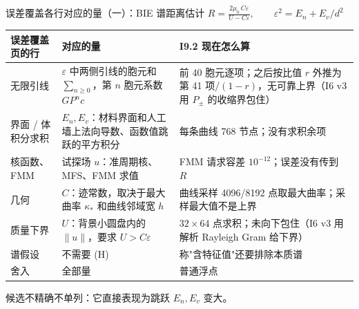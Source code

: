 \documentclass[aspectratio=169,11pt,fontset=fandol]{ctexbeamer}
\newcommand{\aside}[1]{{\footnotesize\color{muted}#1}}
\begin{document}
\begin{frame}{误差覆盖各行对应的量（一）：BIE 谱距离估计}
  \centering\small
  $\displaystyle R=\frac{2\mu_0\,C\varepsilon}{U-C\varepsilon},\qquad
    \varepsilon^2=E_n+E_v/d^2$
  \par\vspace{0.4em}\scriptsize
  \begin{tabular}{p{}p{}p{}}
    \toprule
    误差覆盖页的行 & 对应的量 & I9.2 现在怎么算 \\
    \midrule
    无限引线 & $\varepsilon$ 中两侧引线的胞元和 $\sum_{n\ge0}$，第 $n$ 胞元系数 $GP^nc$ &
      前 40 胞元逐项；之后按比值 $r$ 外推为 第 41 项$/(1-r)$，\alert{无可靠上界}（I6 v3 用 $P_\pm$ 的收缩界包住） \\
    界面 / 体积分求积 & $E_n,E_v$：材料界面和人工墙上法向导数、函数值跳跃的平方积分 &
      每条曲线 768 节点；没有求积余项 \\
    核函数、FMM & 试探场 $u$：准周期核、MFS、FMM 求值 &
      FMM 请求容差 $10^{-12}$；误差没有传到 $R$ \\
    几何 & $C$：迹常数，取决于最大曲率 $\kappa_*$ 和曲线邻域宽 $h$ &
      曲线采样 4096/8192 点取最大曲率；采样最大值不是上界 \\
    质量下界 & $U$：背景小圆盘内的 $\|u\|$，要求 $U>C\varepsilon$ &
      $32\times64$ 点求积；未向下包住（I6 v3 用解析 Rayleigh Gram 给下界） \\
    谱假设 & 不需要 (H) & 称"含特征值"还要排除本质谱 \\
    舍入 & 全部量 & 普通浮点 \\
    \bottomrule
  \end{tabular}
  \raggedright\vspace{0.3em}
  \aside{候选不精确不单列：它直接表现为跳跃 $E_n,E_v$ 变大。}
\end{frame}
\end{document}
